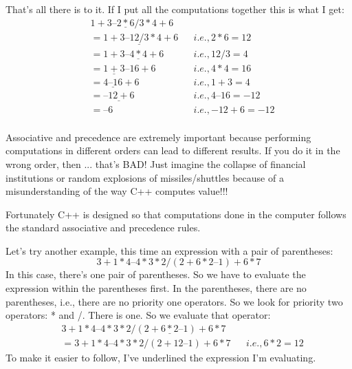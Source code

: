 That's all there is to it. If I put all the computations together this is what I
get:
\begin{align*}
  &1+3–\underline{2*6}/ 3*4+6 \\
  &= 1 + 3 – \underline{12 / 3} * 4 + 6 & &i.e., 2 * 6 = 12\\
  &=1+3–\underline{4*4}+6 & &i.e., 12/ 3 = 4\\
  &= \underline{1 + 3} – 16 + 6 & &i.e., 4 * 4 = 16\\
  &= \underline{4 – 16} + 6 & &i.e., 1 + 3 = 4\\
  &= \underline{–12 + 6} & &i.e., 4 – 16 = -12\\
  &= –6 & &i.e., -12 + 6 = -12\\
\end{align*}

%

Associative and precedence are extremely important because performing
computations in different orders can lead to different results. If you do it
in the wrong order, then ... that's BAD! Just imagine the collapse of
financial institutions or random explosions of missiles/shuttles because of
a misunderstanding of the way C++ computes value!!!


Fortunately C++ is designed so that computations done in the computer
follows the standard associative and precedence rules.

%
%
%


Let's try another example, this time an expression with a pair of
parentheses:
\[3 + 1 * 4 – 4 * 3 * 2 / (2 + 6 * 2 – 1) + 6 * 7\]
In this case, there's one pair of parentheses. So we have to evaluate the
expression within the parentheses first. In the parentheses, there are no
parentheses, i.e., there are no priority one operators. So we look for
priority two operators: * and /. There is one. So we evaluate that
operator:
\begin{align*}
  &3 + 1 * 4 – 4 * 3 * 2 / (2 + \underline{6 * 2} – 1) + 6 * 7\\
  &= 3 + 1 * 4 – 4 * 3 * 2 / (2 + 12 – 1) + 6 * 7 & &i.e., 6 * 2 = 12
\end{align*}
To make it easier to follow, I've underlined the expression I'm evaluating.

